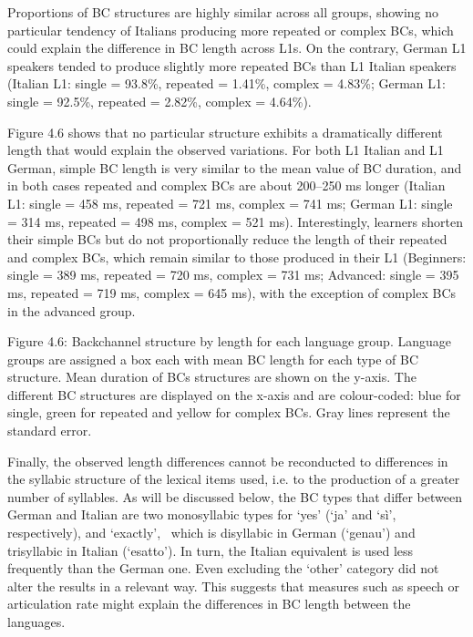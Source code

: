 \begin{styleStandard}
Proportions of BC structures are highly similar across all groups, showing no particular tendency of Italians producing more repeated or complex BCs, which could explain the difference in BC length across L1s. On the contrary, German L1 speakers tended to produce slightly more repeated BCs than L1 Italian speakers (Italian L1: single = 93.8\%, repeated = 1.41\%, complex = 4.83\%; German L1: single = 92.5\%, repeated = 2.82\%, complex = 4.64\%).
\end{styleStandard}

\begin{styleStandard}
Figure 4.6 shows that no particular structure exhibits a dramatically different length that would explain the observed variations. For both L1 Italian and L1 German, simple BC length is very similar to the mean value of BC duration, and in both cases repeated and complex BCs are about 200–250 ms longer (Italian L1: single = 458 ms, repeated = 721 ms, complex = 741 ms; German L1: single = 314 ms, repeated = 498 ms, complex = 521 ms). Interestingly, learners shorten their simple BCs but do not proportionally reduce the length of their repeated and complex BCs, which remain similar to those produced in their L1 (Beginners: single = 389 ms, repeated = 720 ms, complex = 731 ms; Advanced: single = 395 ms, repeated = 719 ms, complex = 645 ms), with the exception of complex BCs in the advanced group.
\end{styleStandard}

\begin{styleStandard}
  [Warning: Image ignored] %
 
\end{styleStandard}

\begin{stylecaption}
Figure 4.6: Backchannel structure by length for each language group. Language groups are assigned a box each with mean BC length for each type of BC structure. Mean duration of BCs structures are shown on the y-axis. The different BC structures are displayed on the x-axis and are colour-coded: blue for single, green for repeated and yellow for complex BCs. Gray lines represent the standard error.
\end{stylecaption}

\begin{styleStandard}
Finally, the observed length differences cannot be reconducted to differences in the syllabic structure of the lexical items used, i.e. to the production of a greater number of syllables. As will be discussed below, the BC types that differ between German and Italian are two monosyllabic types for ‘yes’ (‘ja’ and ‘sì’, respectively), and ‘exactly’, \ which is disyllabic in German (‘genau’) and trisyllabic in Italian (‘esatto’). In turn, the Italian equivalent is used less frequently than the German one. Even excluding the ‘other’ category did not alter the results in a relevant way. This suggests that measures such as speech or articulation rate might explain the differences in BC length between the languages.
\end{styleStandard}

